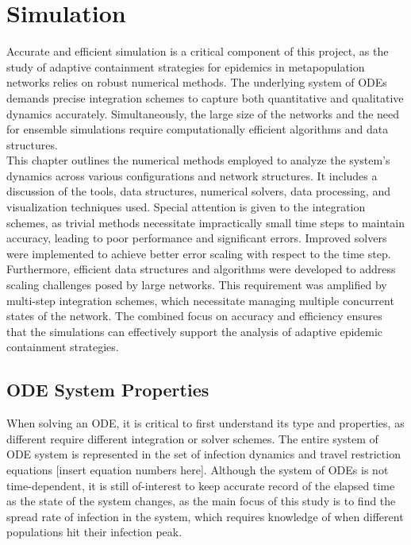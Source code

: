 \section{Simulation}
Accurate and efficient simulation is a critical component of this project, as the study of adaptive containment strategies for epidemics in metapopulation networks relies on robust numerical methods. The underlying system of ODEs demands precise integration schemes to capture both quantitative and qualitative dynamics accurately. Simultaneously, the large size of the networks and the need for ensemble simulations require computationally efficient algorithms and data structures.\\

This chapter outlines the numerical methods employed to analyze the system's dynamics across various configurations and network structures. It includes a discussion of the tools, data structures, numerical solvers, data processing, and visualization techniques used. Special attention is given to the integration schemes, as trivial methods necessitate impractically small time steps to maintain accuracy, leading to poor performance and significant errors. Improved solvers were implemented to achieve better error scaling with respect to the time step.\\

Furthermore, efficient data structures and algorithms were developed to address scaling challenges posed by large networks. This requirement was amplified by multi-step integration schemes, which necessitate managing multiple concurrent states of the network. The combined focus on accuracy and efficiency ensures that the simulations can effectively support the analysis of adaptive epidemic containment strategies.\\

\subsection{ODE System Properties}
When solving an ODE, it is critical to first understand its type and properties, as different require different integration or solver schemes. The entire system of ODE system is represented in the set of infection dynamics and travel restriction equations [insert equation numbers here]. Although the system of ODEs is not time-dependent, it is still of-interest to keep accurate record of the elapsed time as the state of the system changes, as the main focus of this study is to find the spread rate of infection in the system, which requires knowledge of when different populations hit their infection peak. 
\\

